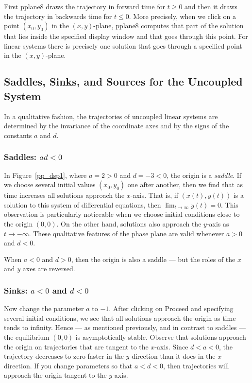 \documentclass{ximera}
\begin{document}
First {\sf pplane8} draws the trajectory in forward time for
$t\ge 0$ and then it draws the trajectory in backwards time for
$t\le 0$.  More precisely, when we click on a point $(x_0,y_0)$ in
the $(x,y)$-plane, {\sf pplane8} computes that part of the
solution that lies inside the specified {\sf display window}
and that goes through this point.  For linear systems there is
precisely one solution that goes through a specified point in
the $(x,y)$-plane. 

\subsection*{Saddles, Sinks, and Sources for the Uncoupled System \protect{\eqref{lin2}}}

In a qualitative fashion, the trajectories of uncoupled linear
systems are determined by the invariance of the coordinate axes
and by the signs of the constants $a$ and $d$.

\subsubsection*{Saddles: $ad<0$} 

In Figure~\ref{pp_dsp1}, where $a=2>0$ and $d=-3<0$, the origin is a
{\em saddle\/}.  If we choose several initial values $(x_0,y_0)$
one after another,  then we find that as time increases all
solutions approach the $x$-axis.  That is, if $(x(t),y(t))$ is a 
solution to this system of differential equations, then 
$\lim_{t\to\infty}y(t)=0$.  This observation is particularly 
noticeable when we choose initial conditions close to the origin $(0,0)$.  
On the other hand, solutions also approach the $y$-axis as $t\to-\infty$.
These qualitative features of the phase plane are valid whenever 
$a>0$ and $d<0$.
 
When $a<0$ and $d>0$, then the origin is also a saddle ---
but the roles of the $x$ and $y$ axes are reversed.

\subsubsection*{Sinks: $a<0$ and $d<0$} 

Now change the parameter $a$ to $-1$. After clicking on {\sf
Proceed} and specifying several initial conditions, we see that
all solutions approach the origin as time tends to infinity.
Hence --- as mentioned previously, and in contrast to saddles ---
the equilibrium $(0,0)$ is asymptotically stable.  Observe that
solutions approach the origin on trajectories that are tangent to
the $x$-axis.  Since $d<a<0$, the trajectory decreases to zero faster
in the $y$ direction than it does in the $x$-direction.  If
you change parameters so that $a<d<0$, then trajectories will
approach the origin tangent to the $y$-axis.
\end{document}
